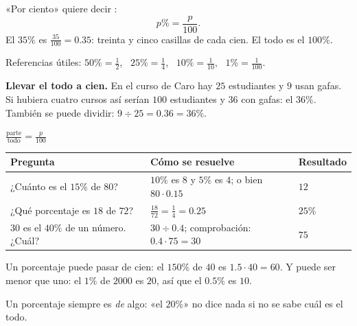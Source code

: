 \documentclass[11pt,a4paper]{article}
\begin{document}
\begin{minipage}[c]{0.6\linewidth}
\begin{definicion}[Porcentaje]
«Por ciento» quiere decir :
\[ p\%=\frac{p}{100}. \]
El $35\%$ es $\tfrac{35}{100}=0.35$: treinta y cinco casillas de cada cien. El todo es el $100\%$.
\end{definicion}
Referencias útiles: $50\%=\tfrac12$, \ $25\%=\tfrac14$, \ $10\%=\tfrac1{10}$, \ $1\%=\tfrac1{100}$.
\end{minipage}\hfill
\begin{minipage}[c]{0.36\linewidth}\centering
{}
\end{minipage}

\textbf{Llevar el todo a cien.} En el curso de Caro hay $25$ estudiantes y $9$ usan gafas. Si hubiera cuatro cursos así
serían $100$ estudiantes y $36$ con gafas: el $36\%$. También se puede dividir: $9\div25=0.36=36\%$.

\begin{clavebox}
$\displaystyle \frac{\text{parte}}{\text{todo}}=\frac{p}{100}$
\end{clavebox}
\begin{center}
\begin{tabularx}{\linewidth}{@{}l L l@{}}
\toprule
Pregunta & Cómo se resuelve & Resultado\\ \midrule
¿Cuánto es el $15\%$ de $80$? & $10\%$ es $8$ y $5\%$ es $4$; o bien $80\cdot0.15$ & $12$\\
¿Qué porcentaje es $18$ de $72$? & $\tfrac{18}{72}=\tfrac14=0.25$ & $25\%$\\
$30$ es el $40\%$ de un número. ¿Cuál? & $30\div0.4$; comprobación: $0.4\cdot75=30$ & $75$\\
\bottomrule
\end{tabularx}
\end{center}
Un porcentaje puede pasar de cien: el $150\%$ de $40$ es $1.5\cdot40=60$. Y puede ser menor que uno: el $1\%$ de
$\num{2000}$ es $20$, así que el $0.5\%$ es $10$.
\begin{ojo}
Un porcentaje siempre es \emph{de} algo: «el $20\%$» no dice nada si no se sabe cuál es el todo.
\end{ojo}
\end{document}
